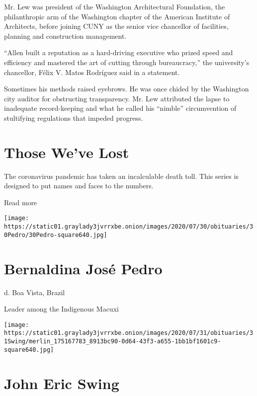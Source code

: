 Mr. Lew was president of the Washington Architectural Foundation, the
philanthropic arm of the Washington chapter of the American Institute of
Architects, before joining CUNY as the senior vice chancellor of
facilities, planning and construction management.

``Allen built a reputation as a hard-driving executive who prized speed
and efficiency and mastered the art of cutting through bureaucracy,''
the university's chancellor, Félix V. Matos Rodríguez said in a
statement.

Sometimes his methods raised eyebrows. He was once chided by the
Washington city auditor for obstructing transparency. Mr. Lew attributed
the lapse to inadequate record-keeping and what he called his ``nimble''
circumvention of stultifying regulations that impeded progress.

\href{https://www.nytimes3xbfgragh.onion/interactive/2020/obituaries/people-died-coronavirus-obituaries.html?action=click\&pgtype=Article\&state=default\&region=BELOW_MAIN_CONTENT\&context=covid_obits_promo}{}

\hypertarget{those-weve-lost}{%
\section{Those We've Lost}\label{those-weve-lost}}

The coronavirus pandemic has taken an incalculable death toll. This
series is designed to put names and faces to the numbers.

Read more

\texttt{[image: https://static01.graylady3jvrrxbe.onion/images/2020/07/30/obituaries/30Pedro/30Pedro-square640.jpg]}

\hypertarget{bernaldina-josuxe9-pedro}{%
\section{Bernaldina José Pedro}\label{bernaldina-josuxe9-pedro}}

d. Boa Vista, Brazil

Leader among the Indigenous Macuxi

\texttt{[image: https://static01.graylady3jvrrxbe.onion/images/2020/07/31/obituaries/31Swing/merlin\_175167783\_8913bc90-0d64-43f3-a655-1bb1bf1601c9-square640.jpg]}

\hypertarget{john-eric-swing}{%
\section{John Eric Swing}\label{john-eric-swing}}

